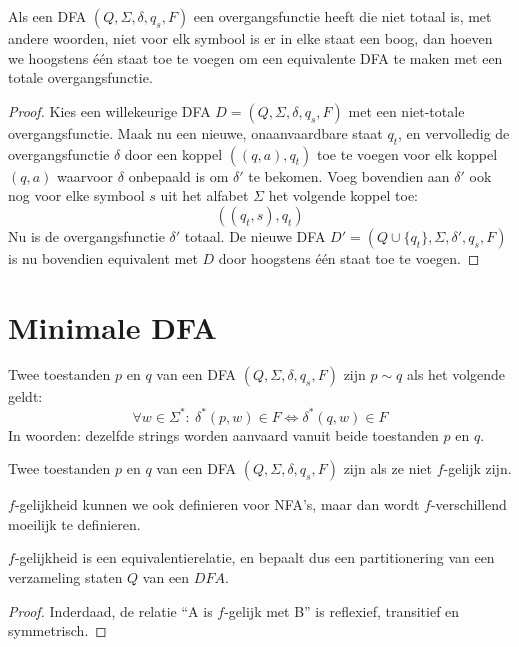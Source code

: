 \documentclass[main.tex]{subfiles}
\begin{document}
\begin{st}
  \label{st:dfa-totale-overgangsfunctie}
  Als een DFA $(Q,\Sigma,\delta,q_{s},F)$ een overgangsfunctie heeft die niet totaal is, met andere woorden, niet voor elk symbool is er in elke staat een boog, dan hoeven we hoogstens \'e\'en staat toe te voegen om een equivalente DFA te maken met een totale overgangsfunctie.

  \begin{proof}
   Kies een willekeurige DFA $D = (Q,\Sigma,\delta,q_{s},F)$ met een niet-totale overgangsfunctie.
   Maak nu een nieuwe, onaanvaardbare staat $q_{t}$, en vervolledig de overgangsfunctie $\delta$ door een koppel $((q,a),q_{t})$ toe te voegen voor elk koppel $(q,a)$ waarvoor $\delta$ onbepaald is om $\delta'$ te bekomen.
   Voeg bovendien aan $\delta'$ ook nog voor elke symbool $s$ uit het alfabet $\Sigma$ het volgende koppel toe:
   \[ ((q_{t},s),q_{t}) \]
   Nu is de overgangsfunctie $\delta'$ totaal.
   De nieuwe DFA $D' = (Q\cup\{ q_{t} \},\Sigma,\delta',q_{s},F)$ is nu bovendien equivalent met $D$ door hoogstens \'e\'en staat toe te voegen.
  \end{proof}
\end{st}

\section{Minimale DFA}
\begin{de}
  Twee toestanden $p$ en $q$ van een DFA $(Q,\Sigma,\delta,q_{s},F)$ zijn  $p\sim q$ als het volgende geldt:
  \[
  \forall w \in \Sigma^{*}:\ \delta^{*}(p,w) \in F \Leftrightarrow \delta^{*}(q,w) \in F
  \]
  In woorden: dezelfde strings worden aanvaard vanuit beide toestanden $p$ en $q$.
\end{de}

\begin{de}
  Twee toestanden $p$ en $q$ van een DFA $(Q,\Sigma,\delta,q_{s},F)$ zijn  als ze niet $f$-gelijk zijn. 
\end{de}

\begin{opm}
  $f$-gelijkheid kunnen we ook definieren voor NFA's, maar dan wordt $f$-verschillend moeilijk te definieren.
\end{opm}

\begin{ei}
  $f$-gelijkheid is een equivalentierelatie, en bepaalt dus een partitionering van een verzameling staten $Q$ van een $DFA$.

  \begin{proof}
    Inderdaad, de relatie ``A is $f$-gelijk met B'' is reflexief, transitief en symmetrisch.
  \end{proof}
\end{ei}
\end{document}
